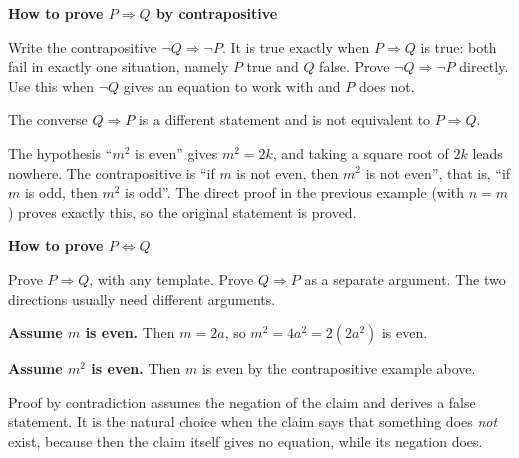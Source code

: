 \documentclass[10pt]{scrartcl}
\newenvironment{methodbox}[1]{\begin{mdframed}[style=methodstyle]\textbf{\color{NavyBlue}#1}\par\vspace{2pt}}{\end{mdframed}}
\begin{document}
\begin{methodbox}{How to prove $P\Rightarrow Q$ by contrapositive}
  \begin{steps}
    \ii Write the contrapositive $\lnot Q\Rightarrow\lnot P$. It is true exactly when $P\Rightarrow Q$ is true: both fail in exactly one situation, namely $P$ true and $Q$ false.
    \ii Prove $\lnot Q\Rightarrow\lnot P$ directly. Use this when $\lnot Q$ gives an equation to work with and $P$ does not.
  \end{steps}
  The converse $Q\Rightarrow P$ is a different statement and is not equivalent to $P\Rightarrow Q$.
\end{methodbox}

\begin{example*}
  The hypothesis ``$m^2$ is even'' gives $m^2=2k$, and taking a square root of $2k$ leads nowhere. The contrapositive is ``if $m$ is not even, then $m^2$ is not even'', that is, ``if $m$ is odd, then $m^2$ is odd''. The direct proof in the previous example (with $n=m$) proves exactly this, so the original statement is proved.
\end{example*}

\begin{methodbox}{How to prove $P\iff Q$}
  \begin{steps}
    \ii Prove $P\Rightarrow Q$, with any template.
    \ii Prove $Q\Rightarrow P$ as a separate argument. The two directions usually need different arguments.
  \end{steps}
\end{methodbox}

\begin{example*}
  \textbf{Assume $m$ is even.} Then $m=2a$, so $m^2=4a^2=2(2a^2)$ is even.

  \textbf{Assume $m^2$ is even.} Then $m$ is even by the contrapositive example above.
\end{example*}

Proof by contradiction assumes the negation of the claim and derives a false statement. It is the natural choice when the claim says that something does \emph{not} exist, because then the claim itself gives no equation, while its negation does.
\end{document}
